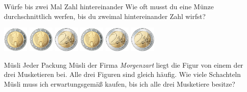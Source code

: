 \documentclass{uebungszettel}
\begin{document}
\begin{aufgabe}{Würfe bis zwei Mal Zahl hintereinander}
  Wie oft musst du eine Münze durchschnittlich werfen, bis du zweimal hintereinander Zahl wirfst?
  \begin{center}
    \includegraphics[width=1.25cm]{euro-kopf}
    \includegraphics[width=1.25cm]{euro-kopf}
    \includegraphics[width=1.25cm]{euro-zahl}
    \includegraphics[width=1.25cm]{euro-kopf}
    \includegraphics[width=1.25cm]{euro-zahl}
    \includegraphics[width=1.25cm]{euro-zahl}
  \end{center}

  \vspace{1cm}
  \begin{center}
  \end{center}
\end{aufgabe}

\begin{aufgabe}{Müsli}
  Jeder Packung Müsli der Firma \textit{Morgenzart} liegt die Figur von einem der drei Musketieren bei.
  Alle drei Figuren sind gleich häufig.
  Wie viele Schachteln Müsli muss ich erwartungsgemäß kaufen, bis ich alle drei Musketiere besitze?

  \vspace{1.5cm}
  \begin{center}
  \end{center}
  \vspace{1cm}
\end{aufgabe}
\end{document}
